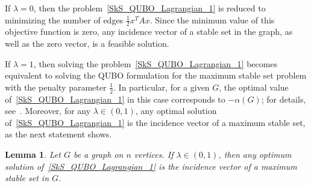 \documentclass{article}
\newtheorem{lem}[thm]{Lemma}
\begin{document}
If $\lambda = 0$, then the problem~\eqref{SkS_QUBO_Lagrangian_1} is reduced to minimizing the number of edges $\frac{1}{2}x^TAx$. Since the minimum value of this objective function is zero, any incidence vector of a stable set in the graph, as well as the zero vector, is a feasible solution.

If $\lambda = 1$, then solving the problem~\eqref{SkS_QUBO_Lagrangian_1} becomes equivalent to solving the QUBO formulation for the maximum stable set problem with the penalty parameter $\frac{1}{2}$. In particular, for a given $G$, the optimal value of~\eqref{SkS_QUBO_Lagrangian_1} in this case corresponds to $-\alpha(G)$; for details, see~\cite[Lemma 2]{Krpan2024}. Moreover, for any $\lambda \in (0, 1)$, any optimal solution of~\eqref{SkS_QUBO_Lagrangian_1} is the incidence vector of a maximum stable set, as the next statement shows.\\

\begin{lem}\label{stable_set_lagrangian}
Let $G$ be a graph on $n$ vertices. If $\lambda \in (0,1)$, then any optimum solution of~\eqref{SkS_QUBO_Lagrangian_1}  is the incidence vector of a maximum stable set in $G$.
\end{lem}
\end{document}
